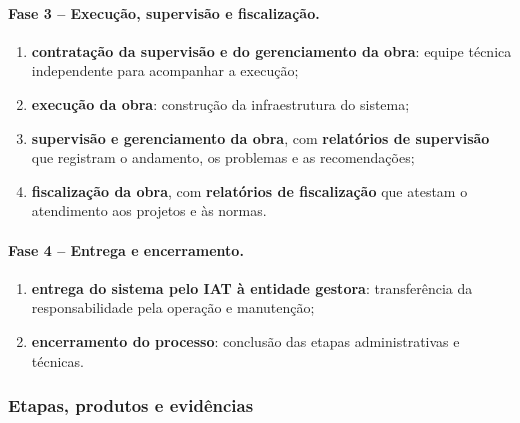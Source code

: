 \paragraph{Fase 3 -- Execução, supervisão e fiscalização.}
\begin{enumerate}[label=\alph*), resume]
  \item \textbf{contratação da supervisão e do gerenciamento da obra}:
        equipe técnica independente para acompanhar a execução;
  \item \textbf{execução da obra}: construção da infraestrutura do sistema;
  \item \textbf{supervisão e gerenciamento da obra}, com \textbf{relatórios
        de supervisão} que registram o andamento, os problemas e as
        recomendações;
  \item \textbf{fiscalização da obra}, com \textbf{relatórios de
        fiscalização} que atestam o atendimento aos projetos e às normas.
\end{enumerate}

\paragraph{Fase 4 -- Entrega e encerramento.}
\begin{enumerate}[label=\alph*), resume]
  \item \textbf{entrega do sistema pelo IAT à entidade gestora}:
        transferência da responsabilidade pela operação e manutenção;
  \item \textbf{encerramento do processo}: conclusão das etapas
        administrativas e técnicas.
\end{enumerate}


\subsubsection{Etapas, produtos e evidências}

